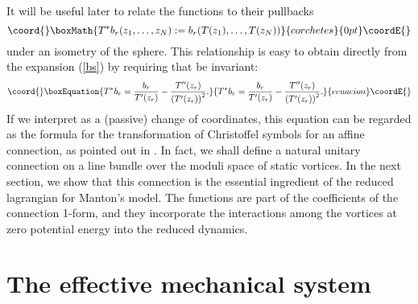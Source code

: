 \documentclass[a4paper,11pt]{article}
\begin{document}
It will be useful later to relate the functions \coordHE{} to their
pullbacks
\[\coord{}\boxMath{
T^{*}b_{r}(z_{1},\ldots,z_{N}):=b_{r}(T(z_{1}),\ldots,T(z_{N})) 
}{corchetes}{0pt}\coordE{}\]
under an isometry \coordHE{} of the sphere. This relationship is
easy to obtain directly from the expansion (\ref{bs}) by requiring
that \coordHE{} be invariant:
\begin{equation}\coord{}\boxEquation{\label{btransf}
T^{*}b_{r}= \frac{b_{r}}{T'(z_{r})}-
\frac{T''(z_{r})}{\left(T'(z_{r})\right)^{2}}.
}{T^{*}b_{r}= \frac{b_{r}}{T'(z_{r})}-
\frac{T''(z_{r})}{\left(T'(z_{r})\right)^{2}}.
}{ecuacion}\coordE{}\end{equation}
If we interpret \coordHE{} as a (passive) change of coordinates, this equation 
can be regarded as the formula for the transformation of Christoffel 
symbols for an affine connection, as pointed out in \cite{MNvvms}. 
In fact, we shall define a natural unitary 
connection on a line bundle over the moduli space of static 
vortices. In the next section, we show that this connection is the 
essential ingredient of the reduced lagrangian for Manton's model.
The functions \coordHE{} are part of the coefficients of the connection
1-form, and they incorporate the interactions among the vortices 
at zero potential energy into the reduced dynamics.



\section{The effective mechanical system}
\end{document}
